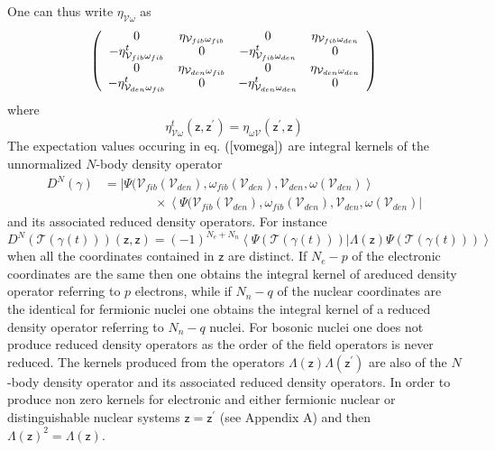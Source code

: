 \documentclass[aps,preprint]{revtex4}%
\begin{document}
One can thus write $\eta_{\mathcal{V\omega}}$ as
\begin{equation}
\left(
\begin{array}
[c]{cccc}%
0 & \eta_{\mathcal{V}_{fib}\omega_{fib}} & 0 & \eta_{\mathcal{V}_{fib}%
\omega_{den}}\\
-\eta_{\mathcal{V}_{fib}\omega_{fib}}^{t} & 0 & -\eta_{\mathcal{V}_{fib}%
\omega_{den}}^{t} & 0\\
0 & \eta_{\mathcal{V}_{den}\omega_{fib}} & 0 & \eta_{\mathcal{V}_{den}%
\omega_{den}}\\
-\eta_{\mathcal{V}_{den}\omega_{fib}}^{t} & 0 & -\eta_{\mathcal{V}_{den}%
\omega_{den}}^{t} & 0
\end{array}
\right)
\end{equation}
where
\begin{equation}
\eta_{\mathcal{V}\omega}^{t}(\mathsf{z},\mathsf{z}^{\prime})=\eta
_{\omega\mathcal{V}}(\mathsf{z}^{\prime},\mathsf{z})
\end{equation}
The expectation values occuring in eq. $\left(  \ref{vomega}\right)  $ are
integral kernels of the unnormalized $N$-body density operator
\begin{align}
D^{N}\left(  \gamma\right)   &  =\left|  \Psi(\mathcal{V}_{fib}(\mathcal{V}%
_{den}),\omega_{fib}(\mathcal{V}_{den}),\mathcal{V}_{den},\omega\left(
\mathcal{V}_{den}\right)  \right\rangle \nonumber\\
&  \qquad\qquad\times\left\langle \Psi(\mathcal{V}_{fib}(\mathcal{V}%
_{den}),\omega_{fib}(\mathcal{V}_{den}),\mathcal{V}_{den},\omega\left(
\mathcal{V}_{den}\right)  \right|
\end{align}
and its associated reduced density operators. For instance
\begin{equation}
D^{N}\left(  \mathcal{T}\left(  \gamma\left(  t\right)  \right)  \right)
\left(  \mathsf{z},\mathsf{z}\right)  =\left(  -1\right)  ^{N_{e}+N_{n}%
}\left\langle \Psi\left(  \mathcal{T}\left(  \gamma\left(  t\right)  \right)
\right)  |\Lambda\left(  \mathsf{z}\right)  \Psi\left(  \mathcal{T}\left(
\gamma\left(  t\right)  \right)  \right)  \right\rangle
\end{equation}
when all the coordinates contained in $\mathsf{z}$ are distinct. If $N_{e}-p$
of the electronic coordinates are the same then one obtains the integral
kernel of areduced density operator referring to $p$ electrons, while if
$N_{n}-q$ of the nuclear coordinates are the identical for fermionic nuclei
one obtains the integral kernel of a reduced density operator referring to
$N_{n}-q$ nuclei. For bosonic nuclei one does not produce reduced density
operators as the order of the field operators is never reduced. The kernels
produced from the operators $\Lambda\left(  \mathsf{z}\right)  \Lambda\left(
\mathsf{z}^{\prime}\right)  $ are also of the $N$-body density operator and
its associated reduced density operators. In order to produce non zero kernels
for electronic and either fermionic nuclear or distinguishable nuclear systems
$\mathsf{z=z}^{\prime}$ (see Appendix A) and then $\Lambda\left(
\mathsf{z}\right)  ^{2}=\Lambda\left(  \mathsf{z}\right)  $.
\end{document}
